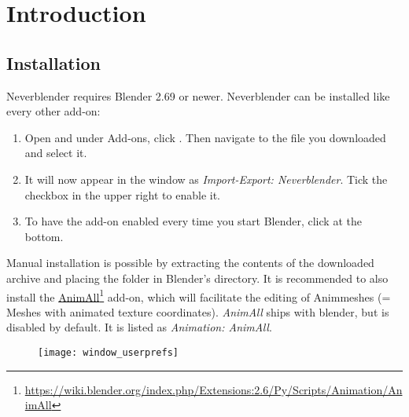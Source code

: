 \chapter{Introduction}

\section{Installation}
Neverblender requires Blender 2.69 or newer. Neverblender can be installed
like every other add-on:
\begin{enumerate}
\item Open  and under Add-ons, 
click . Then navigate to the file you downloaded and select it.
\item It will now appear in the window as \textit{Import-Export: Neverblender}. Tick the checkbox in the upper right to enable it.
\item To have the add-on enabled every time you start Blender, click  at the bottom.
\end{enumerate}
Manual installation is possible by extracting the contents of the downloaded archive and 
placing the  folder in Blender's  directory. 
It is recommended to also install the \href{https://wiki.blender.org/index.php/Extensions:2.6/Py/Scripts/Animation/AnimAll}{AnimAll}\footnote{\href{https://wiki.blender.org/index.php/Extensions:2.6/Py/Scripts/Animation/AnimAll}{https://wiki.blender.org/index.php/Extensions:2.6/Py/Scripts/Animation/AnimAll}} add-on, which will facilitate the 
editing of Animmeshes (= Meshes with animated texture coordinates). \textit{AnimAll} ships with 
blender, but is disabled by default. It is listed as \textit{Animation: AnimAll}.

\begin{figure}[hb]
    \centering
    \texttt{[image: window\_userprefs]}
\end{figure}

